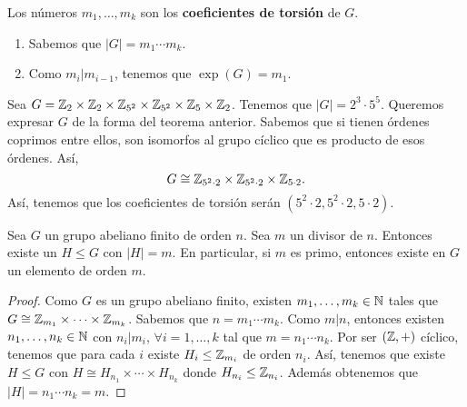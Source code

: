 \begin{definition}
Los números $\displaystyle m_{1}, \ldots, m_{k} $ son los \textbf{coeficientes de torsión} de $\displaystyle G $. 
\end{definition}
\begin{observation}
\begin{enumerate}
\item Sabemos que $\displaystyle \left|G\right| = m_{1} \cdots m_{k} $.
\item Como $\displaystyle m_{i}|m_{i-1} $, tenemos que $\displaystyle \exp\left(G\right) = m_{1} $.
\end{enumerate}
\end{observation}
\begin{eg}
Sea $\displaystyle G = \mathbb{Z}_{2} \times \mathbb{Z}_{2} \times \mathbb{Z}_{5^{2}} \times \mathbb{Z}_{5^{2}} \times \mathbb{Z}_{5} \times \mathbb{Z}_{2} $. Tenemos que $\displaystyle \left|G\right| = 2^{3} \cdot 5^{5} $. Queremos expresar $\displaystyle G $ de la forma del teorema anterior. Sabemos que si tienen órdenes coprimos entre ellos, son isomorfos al grupo cíclico que es producto de esos órdenes. Así,
\[G \cong \mathbb{Z}_{5^{2} \cdot 2} \times \mathbb{Z}_{5^{2} \cdot 2} \times \mathbb{Z}_{5 \cdot 2} .\]
Así, tenemos que los coeficientes de torsión serán $\displaystyle \left(5^{2} \cdot 2, 5^{2} \cdot 2, 5 \cdot 2\right) $. 
\end{eg}
\begin{prop}
Sea $\displaystyle G $ un grupo abeliano finito de orden $\displaystyle n $. Sea $\displaystyle m $ un divisor de $\displaystyle n $. Entonces existe un $\displaystyle H \leq G $ con $\displaystyle \left|H\right| = m $. En particular, si $\displaystyle m $ es primo, entonces existe en $\displaystyle G $ un elemento de orden $\displaystyle m $.
\end{prop}
\begin{proof}
Como $\displaystyle G $ es un grupo abeliano finito, existen $\displaystyle m_{1}, \ldots, m_{k} \in \mathbb{N} $ tales que $\displaystyle G \cong \mathbb{Z}_{m_{1}} \times \cdots \times \mathbb{Z}_{m_{k}} $. Sabemos que $\displaystyle n = m_{1} \cdots m_{k} $. Como $\displaystyle m | n $, entonces existen $\displaystyle n_{1}, \ldots, n_{k} \in \mathbb{N} $ con $\displaystyle n_{i}|m_{i} $, $\displaystyle \forall i = 1, \ldots, k $ tal que $\displaystyle m = n_{1} \cdots n_{k} $. 
Por ser $\displaystyle \left(\mathbb{Z}, +\right) $ cíclico, tenemos que para cada $\displaystyle i $ existe $\displaystyle H_{i}\leq \mathbb{Z}_{m_{i}} $ de orden $\displaystyle n_{i} $.
Así, tenemos que existe $\displaystyle H \leq G $ con $\displaystyle H \cong H_{n_{1}} \times \cdots \times H_{n_{k}} $ donde $\displaystyle H_{n_{i}} \leq \mathbb{Z}_{n_{i}} $. Además obtenemos que $\displaystyle \left|H\right| = n_{1} \cdots n_{k} = m $. 
\end{proof}
